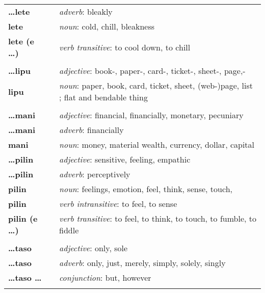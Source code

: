 \begin{supertabular}{p{2,5cm}|ll}
\textbf{\dots lete} && \textit{adverb}: bleakly \\ %
\textbf{lete} && \textit{noun}: cold, chill, bleakness \\ %
\textbf{lete (e \dots)} && \textit{verb transitive}: to cool down, to chill \\ %
 && \\ %
%
\textbf{\dots lipu} && \textit{adjective}: book-, paper-, card-, ticket-, sheet-, page,- \\ %
\textbf{lipu} && \textit{noun}: paper, book, card, ticket, sheet, (web-)page, list ; flat and bendable thing \\ %
 && \\ %
%
\textbf{\dots mani} && \textit{adjective}: financial, financially, monetary, pecuniary \\ %
\textbf{\dots mani} && \textit{adverb}: financially \\ %
\textbf{mani} && \textit{noun}: money, material wealth, currency, dollar, capital \\ %
%
\textbf{\dots pilin} && \textit{adjective}: sensitive, feeling, empathic \\ %
\textbf{\dots pilin} && \textit{adverb}: perceptively \\ %
\textbf{pilin} && \textit{noun}: feelings, emotion, feel, think, sense, touch, \\ %
\textbf{pilin} && \textit{verb intransitive}: to feel, to sense \\ %
\textbf{pilin (e \dots)} && \textit{verb transitive}: to feel, to think, to touch, to fumble, to fiddle \\ %
 && \\ %
%
\textbf{\dots taso} && \textit{adjective}: only, sole \\ %
\textbf{\dots taso} && \textit{adverb}: only, just, merely, simply, solely, singly \\ %
\textbf{\dots taso \dots} && \textit{conjunction}: but, however \\ %
 && \\ %
%
\end{supertabular} \\
%
\newpage

